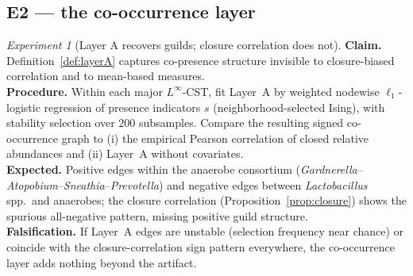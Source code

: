 \documentclass[11pt]{article}
\theoremstyle{definition}
\theoremstyle{plain}
\theoremstyle{remark}
\newtheorem{experiment}{Experiment}
\newcommand{\Linf}{L^{\infty}}
\newcommand{\1}{\mathbf{1}}
\begin{document}
\subsection{E2 --- the co-occurrence layer}
\begin{experiment}[Layer A recovers guilds; closure correlation does not]\label{exp:layerA}
\textbf{Claim.} Definition~\ref{def:layerA} captures co-presence structure
invisible to closure-biased correlation and to mean-based measures.\\
\textbf{Procedure.} Within each major $\Linf$-CST, fit Layer~A by weighted
nodewise $\ell_1$-logistic regression of presence indicators $s$
(neighborhood-selected Ising), with stability selection over $200$ subsamples.
Compare the resulting signed co-occurrence graph to (i) the empirical Pearson
correlation of closed relative abundances and (ii) Layer~A without covariates.\\
\textbf{Expected.} Positive edges within the anaerobe consortium
(\emph{Gardnerella}--\emph{Atopobium}--\emph{Sneathia}--\emph{Prevotella}) and
negative edges between \emph{Lactobacillus} spp.\ and anaerobes; the closure
correlation (Proposition~\ref{prop:closure}) shows the spurious all-negative
pattern, missing positive guild structure.\\
\textbf{Falsification.} If Layer~A edges are unstable (selection frequency near
chance) or coincide with the closure-correlation sign pattern everywhere, the
co-occurrence layer adds nothing beyond the artifact.
\end{experiment}

\end{document}
